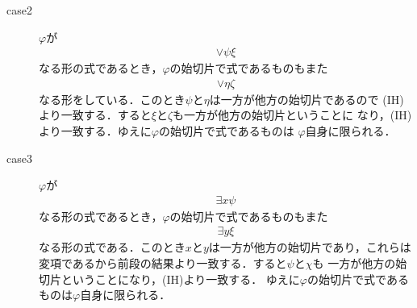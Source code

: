 \begin{metaprf}
\begin{description}
\begin{description}
					\item[case2] $\varphi$が
						\begin{align}
							\vee \psi \xi
						\end{align}
						なる形の式であるとき，$\varphi$の始切片で式であるものもまた
						\begin{align}
							\vee \eta \zeta
						\end{align}
						なる形をしている．このとき$\psi$と$\eta$は一方が他方の始切片であるので
						(IH)より一致する．すると$\xi$と$\zeta$も一方が他方の始切片ということに
						なり，(IH)より一致する．ゆえに$\varphi$の始切片で式であるものは
						$\varphi$自身に限られる．
						
					\item[case3] $\varphi$が
						\begin{align}
							\exists x \psi
						\end{align}
						なる形の式であるとき，$\varphi$の始切片で式であるものもまた
						\begin{align}
							\exists y \xi
						\end{align}
						なる形の式である．このとき$x$と$y$は一方が他方の始切片であり，これらは
						変項であるから前段の結果より一致する．すると$\psi$と$\chi$も
						一方が他方の始切片ということになり，(IH)より一致する．
						ゆえに$\varphi$の始切片で式であるものは$\varphi$自身に限られる．
						\QED
				\end{description}
		\end{description}
	\end{metaprf}
	
